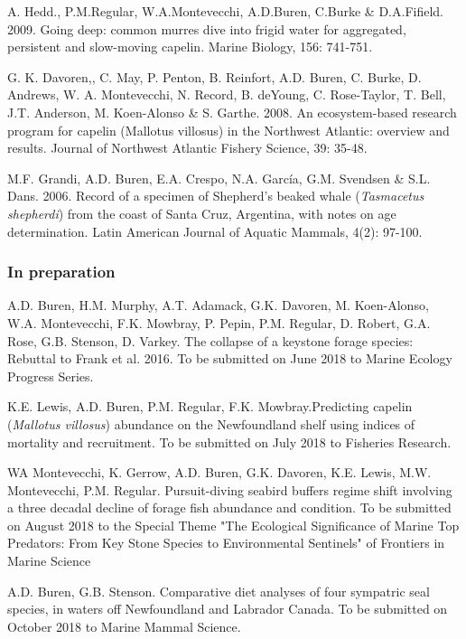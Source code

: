 \documentclass{res}
\begin{document}
\begin{resume}
\begin{hangparas}{.4in}{1}
A. Hedd., P.M.Regular, W.A.Montevecchi, A.D.Buren, C.Burke \& D.A.Fifield. 2009. Going deep: common murres dive into frigid water for aggregated, persistent and slow-moving capelin. Marine Biology, 156: 741-751.

G. K. Davoren,, C. May, P. Penton, B. Reinfort, A.D. Buren, C. Burke, D. Andrews, W. A. Montevecchi, N. Record, B. deYoung, C. Rose-Taylor, T. Bell, J.T. Anderson, M. Koen-Alonso \& S. Garthe. 2008. An ecosystem-based research program for capelin (Mallotus villosus) in the Northwest Atlantic: overview and results. Journal of Northwest Atlantic Fishery Science, 39: 35-48.

M.F. Grandi, A.D. Buren, E.A. Crespo, N.A. García, G.M. Svendsen \& S.L. Dans. 2006. Record of a specimen of Shepherd’s beaked whale (\textit{Tasmacetus shepherdi}) from the coast of Santa Cruz, Argentina, with notes on age determination. Latin American Journal of Aquatic Mammals, 4(2): 97-100.
 
\end{hangparas}
\subsubsection{In preparation}
\begin{hangparas}{.4in}{1}

A.D. Buren, H.M. Murphy, A.T. Adamack, G.K. Davoren, M. Koen-Alonso, W.A. Montevecchi, F.K. Mowbray, P. Pepin, P.M. Regular, D. Robert, G.A. Rose, G.B. Stenson, D. Varkey. The collapse of a keystone forage species: Rebuttal to Frank et al. 2016. To be submitted on June 2018 to Marine Ecology Progress Series.

K.E. Lewis, A.D. Buren, P.M. Regular, F.K. Mowbray.Predicting capelin (\textit{Mallotus villosus}) abundance on the Newfoundland shelf using indices of mortality and recruitment. To be submitted on July 2018 to Fisheries Research.

WA Montevecchi, K. Gerrow, A.D. Buren, G.K. Davoren, K.E. Lewis, M.W. Montevecchi, P.M. Regular. Pursuit-diving seabird buffers regime shift involving a three decadal decline of forage fish abundance and condition. To be submitted on August 2018 to the Special Theme "The Ecological Significance of Marine Top Predators: From Key Stone Species to Environmental Sentinels" of Frontiers in Marine Science


A.D. Buren, G.B. Stenson. Comparative diet analyses of four sympatric seal species, in waters off Newfoundland and Labrador Canada. To be submitted on October 2018 to Marine Mammal Science.
 

\end{hangparas}
\end{resume}
\end{document}

